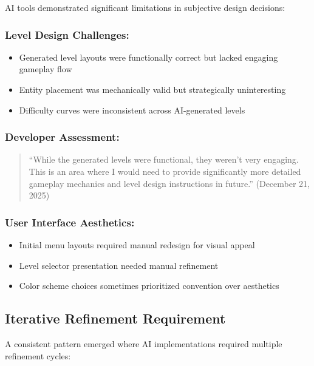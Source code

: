 \documentclass[12pt,a4paper]{article}
\begin{document}
AI tools demonstrated significant limitations in subjective design decisions:

\subsubsection*{Level Design Challenges:}
\begin{itemize}
    \item Generated level layouts were functionally correct but lacked engaging gameplay flow
    \item Entity placement was mechanically valid but strategically uninteresting
    \item Difficulty curves were inconsistent across AI-generated levels
\end{itemize}

\subsubsection*{Developer Assessment:}
\begin{quote}
``While the generated levels were functional, they weren't very engaging. This is an area where I would need to provide significantly more detailed gameplay mechanics and level design instructions in future.'' (December 21, 2025)
\end{quote}

\subsubsection*{User Interface Aesthetics:}
\begin{itemize}
    \item Initial menu layouts required manual redesign for visual appeal
    \item Level selector presentation needed manual refinement
    \item Color scheme choices sometimes prioritized convention over aesthetics
\end{itemize}

\subsection{Iterative Refinement Requirement}

A consistent pattern emerged where AI implementations required multiple refinement cycles:
\end{document}

